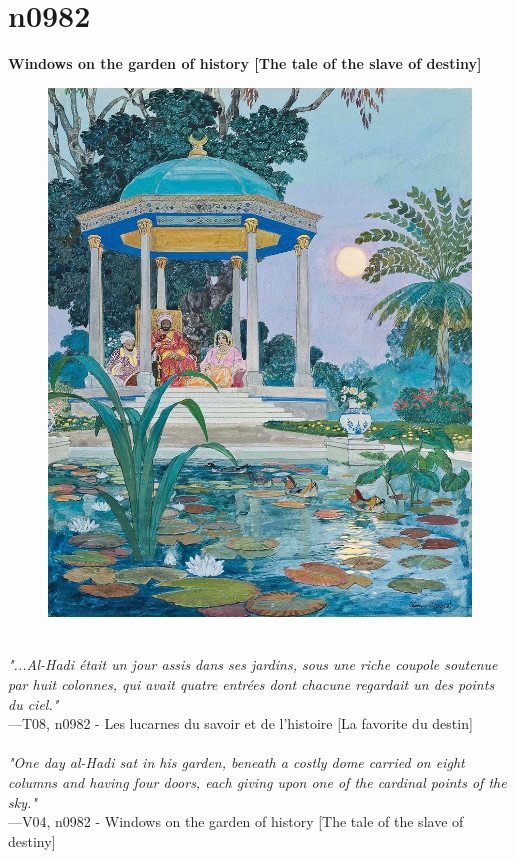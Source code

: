 \documentclass[../Carre_nights.tex]{subfiles}
\begin{document}
\newpage

\section{n0982}
\textbf{\Large{Windows on the garden of history [The tale of the slave of destiny]}} \\

\begin{figure}[ht]
\centering
\includegraphics[height=\figsize]{illustrations/volume_8/T08, n0982 - Les lucarnes du savoir et de l'histoire [La favorite du destin].jpg}
\end{figure}

\textit{\\
"...Al-Hadi était un jour assis dans ses jardins, sous une riche coupole soutenue par huit colonnes, qui avait quatre entrées dont chacune regardait un des points du ciel."} \\
—T08, n0982 - Les lucarnes du savoir et de l'histoire [La favorite du destin] \\~\\
\textit{"One day al-Hadi sat in his garden, beneath a costly dome carried on eight columns and having four doors, each giving upon one of the cardinal points of the sky."} \\
—V04, n0982 - Windows on the garden of history [The tale of the slave of destiny]
\end{document}
